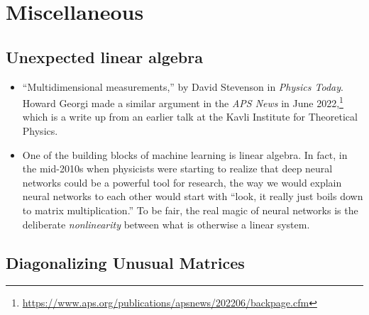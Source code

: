\documentclass[12pt, oneside]{report}    %
\let\oldsection\section
\def\section{%
  \setcounter{sidenote}{1}%
  \oldsection
}
\begin{document}




\chapter{Miscellaneous}

\section{Unexpected linear algebra}

\begin{itemize}
    \item ``Multidimensional measurements,'' by David Stevenson in \emph{Physics Today}\autocite{10.1063/pt.ogyk.yscx}. Howard Georgi made a similar argument in the \emph{APS News} in June 2022,\footnote{\url{https://www.aps.org/publications/apsnews/202206/backpage.cfm}} which is a write up from an earlier talk at the Kavli Institute for Theoretical Physics\autocite{Georgi:2022jfv}.

    \item One of the building blocks of machine learning is linear algebra. In fact, in the mid-2010s when physicists were starting to realize that deep neural networks could be a powerful tool for research, the way we would explain neural networks to each other would start with ``look, it really just boils down to matrix multiplication.'' To be fair, the real magic of neural networks is the deliberate \emph{nonlinearity} between what is otherwise a linear system. 

\end{itemize}

\section{Diagonalizing Unusual Matrices}














\printindex

% 
\end{document}
